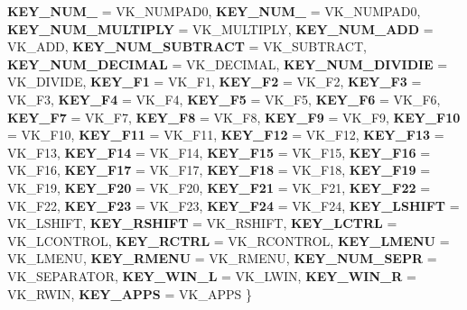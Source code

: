 \begin{DoxyCompactItemize}
{\bfseries K\+E\+Y\+\_\+\+N\+U\+M\+\_} = V\+K\+\_\+\+N\+U\+M\+P\+A\+D0, 
{\bfseries K\+E\+Y\+\_\+\+N\+U\+M\+\_} = V\+K\+\_\+\+N\+U\+M\+P\+A\+D0, 
{\bfseries K\+E\+Y\+\_\+\+N\+U\+M\+\_\+\+M\+U\+L\+T\+I\+P\+LY} = V\+K\+\_\+\+M\+U\+L\+T\+I\+P\+LY, 
{\bfseries K\+E\+Y\+\_\+\+N\+U\+M\+\_\+\+A\+DD} = V\+K\+\_\+\+A\+DD, 
\newline
{\bfseries K\+E\+Y\+\_\+\+N\+U\+M\+\_\+\+S\+U\+B\+T\+R\+A\+CT} = V\+K\+\_\+\+S\+U\+B\+T\+R\+A\+CT, 
{\bfseries K\+E\+Y\+\_\+\+N\+U\+M\+\_\+\+D\+E\+C\+I\+M\+AL} = V\+K\+\_\+\+D\+E\+C\+I\+M\+AL, 
{\bfseries K\+E\+Y\+\_\+\+N\+U\+M\+\_\+\+D\+I\+V\+I\+D\+IE} = V\+K\+\_\+\+D\+I\+V\+I\+DE, 
{\bfseries K\+E\+Y\+\_\+\+F1} = V\+K\+\_\+\+F1, 
\newline
{\bfseries K\+E\+Y\+\_\+\+F2} = V\+K\+\_\+\+F2, 
{\bfseries K\+E\+Y\+\_\+\+F3} = V\+K\+\_\+\+F3, 
{\bfseries K\+E\+Y\+\_\+\+F4} = V\+K\+\_\+\+F4, 
{\bfseries K\+E\+Y\+\_\+\+F5} = V\+K\+\_\+\+F5, 
\newline
{\bfseries K\+E\+Y\+\_\+\+F6} = V\+K\+\_\+\+F6, 
{\bfseries K\+E\+Y\+\_\+\+F7} = V\+K\+\_\+\+F7, 
{\bfseries K\+E\+Y\+\_\+\+F8} = V\+K\+\_\+\+F8, 
{\bfseries K\+E\+Y\+\_\+\+F9} = V\+K\+\_\+\+F9, 
\newline
{\bfseries K\+E\+Y\+\_\+\+F10} = V\+K\+\_\+\+F10, 
{\bfseries K\+E\+Y\+\_\+\+F11} = V\+K\+\_\+\+F11, 
{\bfseries K\+E\+Y\+\_\+\+F12} = V\+K\+\_\+\+F12, 
{\bfseries K\+E\+Y\+\_\+\+F13} = V\+K\+\_\+\+F13, 
\newline
{\bfseries K\+E\+Y\+\_\+\+F14} = V\+K\+\_\+\+F14, 
{\bfseries K\+E\+Y\+\_\+\+F15} = V\+K\+\_\+\+F15, 
{\bfseries K\+E\+Y\+\_\+\+F16} = V\+K\+\_\+\+F16, 
{\bfseries K\+E\+Y\+\_\+\+F17} = V\+K\+\_\+\+F17, 
\newline
{\bfseries K\+E\+Y\+\_\+\+F18} = V\+K\+\_\+\+F18, 
{\bfseries K\+E\+Y\+\_\+\+F19} = V\+K\+\_\+\+F19, 
{\bfseries K\+E\+Y\+\_\+\+F20} = V\+K\+\_\+\+F20, 
{\bfseries K\+E\+Y\+\_\+\+F21} = V\+K\+\_\+\+F21, 
\newline
{\bfseries K\+E\+Y\+\_\+\+F22} = V\+K\+\_\+\+F22, 
{\bfseries K\+E\+Y\+\_\+\+F23} = V\+K\+\_\+\+F23, 
{\bfseries K\+E\+Y\+\_\+\+F24} = V\+K\+\_\+\+F24, 
{\bfseries K\+E\+Y\+\_\+\+L\+S\+H\+I\+FT} = V\+K\+\_\+\+L\+S\+H\+I\+FT, 
\newline
{\bfseries K\+E\+Y\+\_\+\+R\+S\+H\+I\+FT} = V\+K\+\_\+\+R\+S\+H\+I\+FT, 
{\bfseries K\+E\+Y\+\_\+\+L\+C\+T\+RL} = V\+K\+\_\+\+L\+C\+O\+N\+T\+R\+OL, 
{\bfseries K\+E\+Y\+\_\+\+R\+C\+T\+RL} = V\+K\+\_\+\+R\+C\+O\+N\+T\+R\+OL, 
{\bfseries K\+E\+Y\+\_\+\+L\+M\+E\+NU} = V\+K\+\_\+\+L\+M\+E\+NU, 
\newline
{\bfseries K\+E\+Y\+\_\+\+R\+M\+E\+NU} = V\+K\+\_\+\+R\+M\+E\+NU, 
{\bfseries K\+E\+Y\+\_\+\+N\+U\+M\+\_\+\+S\+E\+PR} = V\+K\+\_\+\+S\+E\+P\+A\+R\+A\+T\+OR, 
{\bfseries K\+E\+Y\+\_\+\+W\+I\+N\+\_\+L} = V\+K\+\_\+\+L\+W\+IN, 
{\bfseries K\+E\+Y\+\_\+\+W\+I\+N\+\_\+R} = V\+K\+\_\+\+R\+W\+IN, 
\newline
{\bfseries K\+E\+Y\+\_\+\+A\+P\+PS} = V\+K\+\_\+\+A\+P\+PS
 \}
\end{DoxyCompactItemize}
